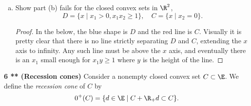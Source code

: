 \documentclass[12pt, letterpaper]{article}
\numberwithin{equation}{subsection}
\begin{document}
\begin{enumerate}[(a)]
\begin{proof}
there is a hyperplane separating $D$ and $C$ (with normal parallel to 
$a$) without touching either of them.
\end{proof}
\item Show part (b) fails for the closed convex sets in $\R^2$, 
\begin{equation*}
D = \{x\mid x_1>0, x_1x_2\geq 1\}, \quad C=\{x\mid x_2=0\}.
\end{equation*}
\begin{proof}
In the below, the blue shape is $D$ and the red line is $C$. Visually it is 
pretty clear that there is no line strictly separating $D$ and $C$, 
extending the $x$ axis to infinity. Any such line must be above the 
$x$ axis, and eventually there is an $x_1$ small enough for 
$x_1y\geq 1$ where $y$ is the height of the line.
\text{}\par
{}
\end{proof}
\end{enumerate}
\textbf{6 ** (Recession cones)} Consider a nonempty closed convex 
set $C\subset\E$. We define the \textit{recession cone} of $C$ by 
\begin{equation*}
0^+(C) = \{d\in\E\mid C+\R_+ d\subset C\}.
\end{equation*}
\end{document}
